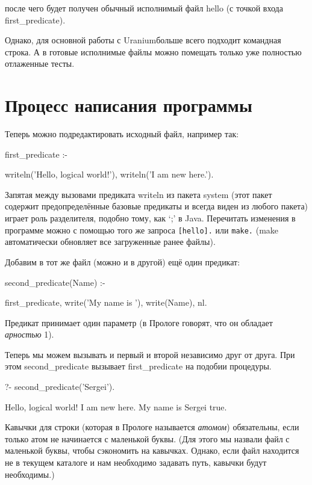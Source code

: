 \documentclass[a4paper]{book}
\def\ur{Uranium}
\begin{document}
после чего будет получен обычный исполнимый файл hello (с точкой
входа first_predicate).

Однако, для основной работы с \ur больше всего подходит командная
строка. А в готовые исполнимые файлы можно помещать только уже
полностью отлаженные тесты.

\section{Процесс написания программы}

Теперь можно подредактировать исходный файл, например так:

\begin{example}{}{}
first_predicate :-

   writeln('Hello, logical world!'),
   writeln('I am new here.').
\end{example}

Запятая между вызовами предиката writeln из пакета system (этот
пакет содержит предопределённые базовые предикаты и всегда виден
из любого пакета) играет роль разделителя, подобно тому, как `;'
в Java. Перечитать изменения в программе можно с помощью того же
запроса \verb|[hello].| или \verb|make.| (make автоматически
обновляет все загруженные ранее файлы).

Добавим в тот же файл (можно и в другой) ещё один предикат:

\begin{example}{}{}
second_predicate(Name) :-

  first_predicate,
  write('My name is '), write(Name), nl.
\end{example}

Предикат принимает один параметр (в Прологе говорят, что он
обладает {\it арностью\/} 1).

Теперь мы можем вызывать и первый и второй независимо друг от
друга. При этом second_predicate вызывает first_predicate на
подобии процедуры.

\begin{example}{}{}
?- second_predicate('Sergei').

Hello, logical world!
I am new here.
My name is Sergei
true.
\end{example}

Кавычки для строки (которая в Прологе называется {\it атомом\/})
обязательны, если только атом не начинается с маленькой
буквы. (Для этого мы назвали файл с маленькой буквы, чтобы
сэкономить на кавычках. Однако, если файл находится не в текущем
каталоге и нам необходимо задавать путь, кавычки будут
необходимы.)
\end{document}
